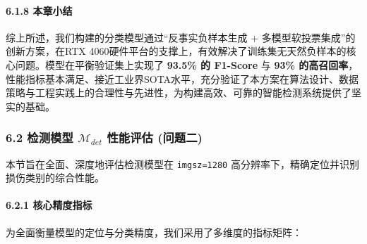 \documentclass[
]{article}
\begin{document}
\paragraph{\texorpdfstring{\textbf{6.1.8
本章小结}}{6.1.8 本章小结}}\label{618-ux672cux7ae0ux5c0fux7ed3}

综上所述，我们构建的分类模型通过``反事实负样本生成 +
多模型软投票集成''的创新方案，在RTX
4060硬件平台的支撑上，有效解决了训练集无天然负样本的核心问题。模型在平衡验证集上实现了
\textbf{93.5\% 的 F1-Score} 与 \textbf{93\%
的高召回率}，性能指标基本满足、接近工业界SOTA水平，充分验证了本方案在算法设计、数据策略与工程实践上的合理性与先进性，为构建高效、可靠的智能检测系统提供了坚实的基础。

\subsubsection{\texorpdfstring{\textbf{6.2 检测模型
\(\mathcal{M}_{det}\) 性能评估
(问题二)}}{6.2 检测模型 \textbackslash mathcal\{M\}\_\{det\} 性能评估 (问题二)}}\label{62-ux68c0ux6d4bux6a21ux578b--ux1d440-ux1d451-ux1d452-ux1d461--ux6027ux80fdux8bc4ux4f30-ux95eeux9898ux4e8c}

本节旨在全面、深度地评估检测模型在 \texttt{imgsz=1280}
高分辨率下，精确定位并识别损伤类别的综合性能。

\paragraph{\texorpdfstring{\textbf{6.2.1
核心精度指标}}{6.2.1 核心精度指标}}\label{621-ux6838ux5fc3ux7cbeux5ea6ux6307ux6807}

为全面衡量模型的定位与分类精度，我们采用了多维度的指标矩阵：
\end{document}
